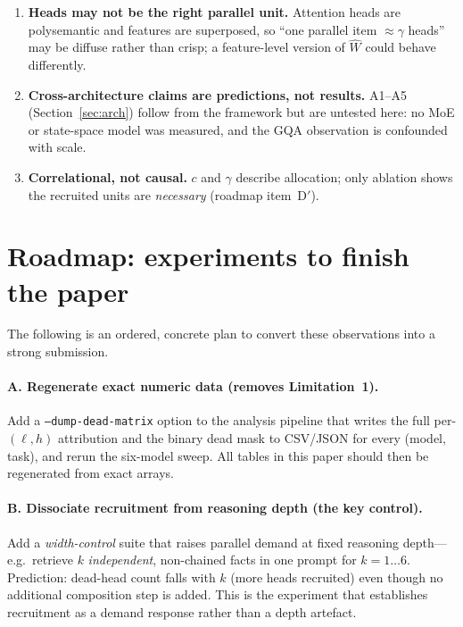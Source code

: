 \documentclass[11pt]{article}
\newcommand{\Wh}{\hat{W}}
\begin{document}
\begin{enumerate}[leftmargin=1.4em,itemsep=2pt]
(Section~\ref{sec:circuits}); all structural claims are therefore about
\emph{shape}, not connectivity.
\item \textbf{Heads may not be the right parallel unit.} Attention heads are
polysemantic and features are superposed, so ``one parallel item $\approx\gamma$
heads'' may be diffuse rather than crisp; a feature-level version of $\Wh$ could
behave differently.
\item \textbf{Cross-architecture claims are predictions, not results.}
A1--A5 (Section~\ref{sec:arch}) follow from the framework but are untested
here: no MoE or state-space model was measured, and the GQA observation is
confounded with scale.
\item \textbf{Correlational, not causal.} $c$ and $\gamma$ describe allocation;
only ablation shows the recruited units are \emph{necessary}
(roadmap item~D$'$).
\end{enumerate}

\section{Roadmap: experiments to finish the paper}\label{sec:roadmap}
The following is an ordered, concrete plan to convert these observations into
a strong submission.

\paragraph{A. Regenerate exact numeric data (removes Limitation~1).}
Add a \texttt{--dump-dead-matrix} option to the analysis pipeline that writes
the full per-$(\ell,h)$ attribution and the binary dead mask to CSV/JSON for
every (model, task), and rerun the six-model sweep. All tables in this paper
should then be regenerated from exact arrays.

\paragraph{B. Dissociate recruitment from reasoning depth (the key control).}
Add a \emph{width-control} suite that raises parallel demand at fixed
reasoning depth---e.g.\ retrieve $k$ \emph{independent}, non-chained facts in
one prompt for $k=1\ldots6$. Prediction: dead-head count falls with $k$ (more
heads recruited) even though no additional composition step is added. This is
the experiment that establishes recruitment as a demand response rather than a
depth artefact.
\end{document}
